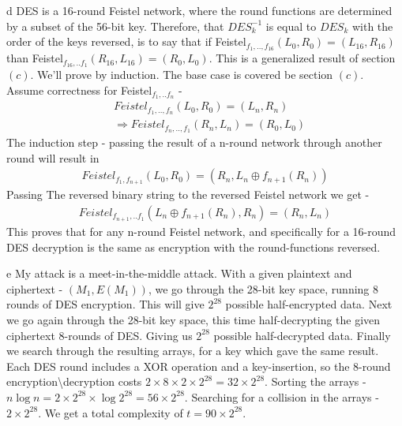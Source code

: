 \documentclass{article}
\begin{document}
\begin{paragraph}
	d DES is a 16-round Feistel network, where the round functions are determined
	by a subset of the 56-bit key. Therefore, that $DES_k^{-1}$ is equal to
	$DES_k$ with the order of the keys reversed, is to say that if Feistel$_{f_1,..,f_{16}}(L_0, R_0) = (L_{16},R_{16})$ than 
	Feistel$_{f_{16},..f_1}(R_{16},L_{16}) = (R_0, L_0)$. This is a generalized result of
	section $(c)$. We'll prove by induction. The base case is covered be section
	$(c)$. Assume correctness for Feistel$_{f_1,..f_n}$ - 
	\begin{align*}
		&Feistel_{f_1,..,f_n}(L_0,R_0) = (L_n,R_n) \\
		&\Rightarrow Feistel_{f_n,..,f_1}(R_n,L_n) = (R_0, L_0)
	\end{align*}
	The induction step - passing the result of a n-round network through another round
	will result in
	\begin{align*}
		Feistel_{f_1,f_{n+1}}(L_0,R_0) = (R_n, L_n\oplus f_{n+1}(R_n))
	\end{align*}
	Passing The reversed binary string to the reversed Feistel network we get - 
	\begin{align*}
		Feistel_{f_{n+1},..f_1}(L_n\oplus f_{n+1}(R_n),R_n) = (R_n,L_n)
	\end{align*}
	This proves that for any n-round Feistel network, and specifically for a 16-round DES
	decryption is the same as encryption with the round-functions reversed.
\end{paragraph}

\begin{paragraph}
	e My attack is a meet-in-the-middle attack. With a given plaintext and ciphertext -
	$(M_1, E(M_1))$, we go through the 28-bit key space, running 8 rounds of
	DES encryption. This will give $2^{28}$ possible half-encrypted data. Next we go again
	through the 28-bit key space, this time half-decrypting the given ciphertext 8-rounds
	of DES. Giving us $2^{28}$ possible half-decrypted data. Finally we search through the 
	resulting arrays, for a key which gave the same result. Each DES round includes
	a XOR operation and a key-insertion, so the 8-round encryption\textbackslash decryption
	costs $2\times 8 \times 2 \times 2^{28} = 32\times 2^{28}$. Sorting the arrays - $n\log{n} = 2\times 2^{28}\times \log{2^{28}}=56\times 2^{28}$.
	Searching for a collision in the arrays - $2\times 2^{28}$. We get a total complexity
	of $t = 90\times 2^{28}$.
\end{paragraph}
\end{document}
